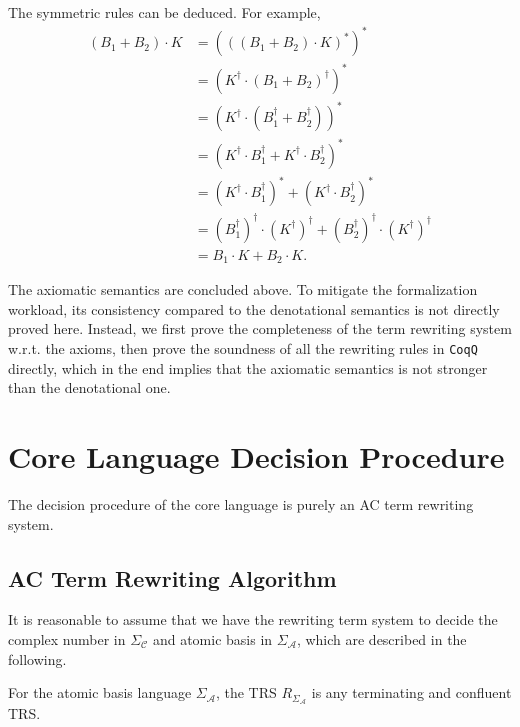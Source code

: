 \documentclass[manuscript, review, timestamp]{acmart}
\begin{document}
The symmetric rules can be deduced. For example,
\begin{align*}
(B_1 + B_2) \cdot K & = (((B_1 + B_2) \cdot K)^*)^* \\
& = (K^\dagger \cdot (B_1 + B_2)^\dagger)^* \\
& = (K^\dagger \cdot (B_1^\dagger + B_2^\dagger))^* \\
& = (K^\dagger \cdot B_1^\dagger + K^\dagger \cdot B_2^\dagger)^* \\
& = (K^\dagger \cdot B_1^\dagger)^* + (K^\dagger \cdot B_2^\dagger)^* \\
& = (B_1^\dagger)^\dagger \cdot (K^\dagger)^\dagger + (B_2^\dagger)^\dagger \cdot (K^\dagger)^\dagger \\
& = B_1 \cdot K + B_2 \cdot K.
\end{align*}

The axiomatic semantics are concluded above. To mitigate the formalization workload, its consistency compared to the denotational semantics is not directly proved here. Instead, we first prove the completeness of the term rewriting system w.r.t. the axioms, then prove the soundness of all the rewriting rules in \texttt{CoqQ} directly, which in the end implies that the axiomatic semantics is not stronger than the denotational one.


\section{Core Language Decision Procedure}
\label{sec: typed_dirac_rules}

The decision procedure of the core language is purely an AC term rewriting system.

\subsection{AC Term Rewriting Algorithm}
It is reasonable to assume that we have the rewriting term system to decide the complex number in $\Sigma_\mathcal{C}$ and atomic basis in $\Sigma_\mathcal{A}$, which are described in the following.

\begin{definition}
  For the atomic basis language $\Sigma_\mathcal{A}$, the TRS $R_{\Sigma_\mathcal{A}}$ is any terminating and confluent TRS.
\end{definition}
\end{document}
